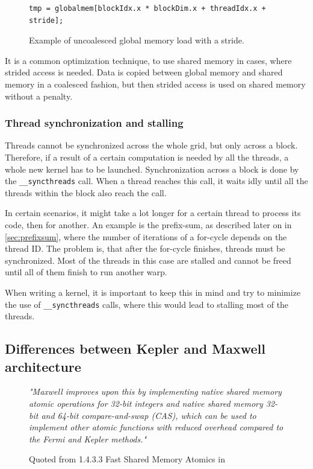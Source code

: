 \begin{figure}[h]
\begin{verbatim}
tmp = globalmem[blockIdx.x * blockDim.x + threadIdx.x + stride];
\end{verbatim}
\caption{Example of uncoalesced global memory load with a stride.}\label{code:uncoalesced}
\end{figure}

It is a common optimization technique, to use shared memory in cases, where strided access is needed. Data is copied between global memory and shared memory in a coalesced fashion, but then strided access is used on shared memory without a penalty.

\subsubsection{Thread synchronization and stalling}

Threads cannot be synchronized across the whole grid, but only across a block. Therefore, if a result of a certain computation is needed by all the threads, a whole new kernel has to be launched. Synchronization across a block is done by the \verb|__syncthreads| call. When a thread reaches this call, it waits idly until all the threads within the block also reach the call.

In certain scenarios, it might take a lot longer for a certain thread to process its code, then for another. An example is the prefix-sum, as described later on in \ref{sec:prefixsum}, where the number of iterations of a for-cycle depends on the thread ID. The problem is, that after the for-cycle finishes, threads must be synchronized. Most of the threads in this case are stalled and cannot be freed until all of them finish to run another warp.

When writing a kernel, it is important to keep this in mind and try to minimize the use of \verb|__syncthreads| calls, where this would lead to stalling most of the threads.

\subsection{Differences between Kepler and Maxwell architecture}


\begin{figure}
\textit{"Maxwell improves upon this by implementing native shared memory atomic operations for 32-bit integers and native shared memory 32-bit and 64-bit compare-and-swap (CAS), which can be used to implement other atomic functions with reduced overhead compared to the Fermi and Kepler methods."}
\caption{Quoted from 1.4.3.3 Fast Shared Memory Atomics in \cite{cuda-toolkit-docs}}
\end{figure}

